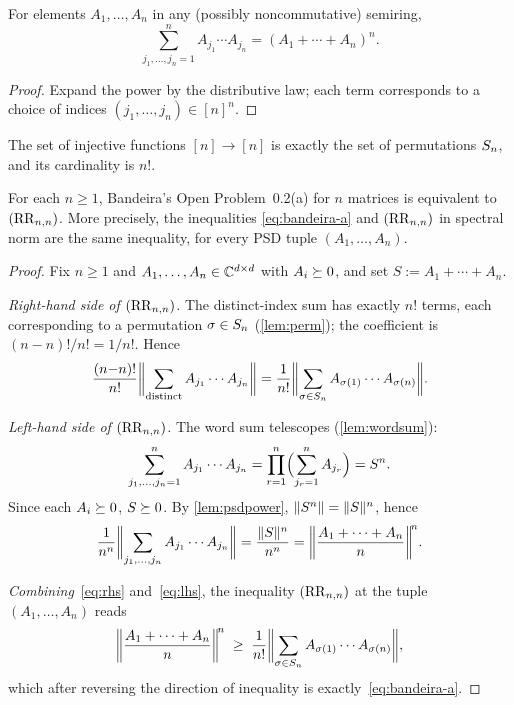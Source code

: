 \begin{lemma}\label{lem:wordsum}
For elements $A_1,\dots,A_n$ in any (possibly noncommutative) semiring,
\[
  \sum_{j_1,\dots,j_n=1}^{n}
    A_{j_1}\cdots A_{j_n}
  = (A_1+\cdots+A_n)^n.
\]
\end{lemma}

\begin{proof}
Expand the power by the distributive law; each term corresponds to a
choice of indices $(j_1,\dots,j_n)\in[n]^n$.
\end{proof}

\begin{lemma}\label{lem:perm}
The set of injective functions $[n]\to[n]$ is exactly the set of
permutations $\Sn$, and its cardinality is $n!$.
\end{lemma}

\begin{theorem}\label{thm:equivalence}
For each $n\ge 1$, Bandeira's Open Problem~0.2(a) for $n$ matrices is
equivalent to $(\RR_{n,n})$.  More precisely, the inequalities
\eqref{eq:bandeira-a} and $(\RR_{n,n})$ in spectral norm are the same
inequality, for every PSD tuple $(A_1,\dots,A_n)$.
\end{theorem}

\begin{proof}
Fix $n\ge 1$ and $A_1,\dots,A_n\in\C^{d\times d}$ with $A_i\PSD$, and
set $S:=A_1+\cdots+A_n$.

\emph{Right-hand side of $(\RR_{n,n})$.}  The distinct-index
sum has exactly $n!$ terms, each corresponding to a permutation
$\sigma\in\Sn$ (\cref{lem:perm}); the coefficient is
$(n{-}n)!/n!=1/n!$.  Hence
\begin{equation}
  \frac{(n{-}n)!}{n!}
  \opnorm[\bigg]{\sum_{\text{distinct}}A_{j_1}\cdots A_{j_n}}
  = \frac{1}{n!}
    \opnorm[\bigg]{\sum_{\sigma\in\Sn}A_{\sigma(1)}\cdots A_{\sigma(n)}}.
  \label{eq:rhs}
\end{equation}

\emph{Left-hand side of $(\RR_{n,n})$.}  The word sum
telescopes (\cref{lem:wordsum}):
\[
  \sum_{j_1,\dots,j_n=1}^n A_{j_1}\cdots A_{j_n}
  = \prod_{r=1}^n \Bigl(\sum_{j_r=1}^n A_{j_r}\Bigr) = S^{n}.
\]
Since each $A_i\PSD$, $S\PSD$.  By \cref{lem:psdpower},
$\opnorm{S^{n}}=\opnorm{S}^{n}$, hence
\begin{equation}
  \frac{1}{n^{n}}
  \opnorm[\bigg]{\sum_{j_1,\dots,j_n}A_{j_1}\cdots A_{j_n}}
  = \frac{\opnorm{S}^n}{n^n}
  = \opnorm[\bigg]{\frac{A_1+\cdots+A_n}{n}}^{\!n}.
  \label{eq:lhs}
\end{equation}

\emph{Combining}~\eqref{eq:rhs} and~\eqref{eq:lhs}, the inequality
$(\RR_{n,n})$ at the tuple $(A_1,\dots,A_n)$ reads
\[
  \opnorm[\bigg]{\frac{A_1+\cdots+A_n}{n}}^{\!n}
  \;\ge\;
  \frac{1}{n!}
  \opnorm[\bigg]{\sum_{\sigma\in\Sn}
    A_{\sigma(1)}\cdots A_{\sigma(n)}},
\]
which after reversing the direction of inequality is
exactly~\eqref{eq:bandeira-a}.
\end{proof}

